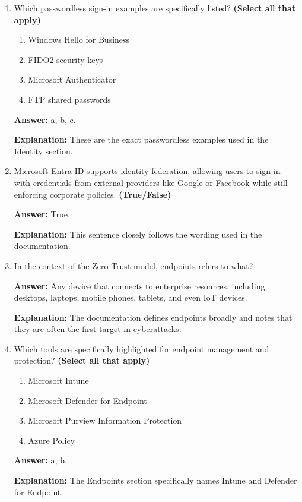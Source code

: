 \documentclass[10pt]{article}
\begin{document}
\begin{enumerate}[leftmargin=*]
\textbf{Explanation:} These three are named in the Identity section as core capabilities of Microsoft Entra ID.

\item Which passwordless sign-in examples are specifically listed? \textbf{(Select all that apply)}
\begin{enumerate}[label=\alph*., leftmargin=1.5em]
\item Windows Hello for Business
\item FIDO2 security keys
\item Microsoft Authenticator
\item FTP shared passwords
\end{enumerate}
\textbf{Answer:} a, b, c.

\textbf{Explanation:} These are the exact passwordless examples used in the Identity section.

\item Microsoft Entra ID supports identity federation, allowing users to sign in with credentials from external providers like Google or Facebook while still enforcing corporate policies. \textbf{(True/False)}

\textbf{Answer:} True.

\textbf{Explanation:} This sentence closely follows the wording used in the documentation.

\item In the context of the Zero Trust model, endpoints refers to what?

\textbf{Answer:} Any device that connects to enterprise resources, including desktops, laptops, mobile phones, tablets, and even IoT devices.

\textbf{Explanation:} The documentation defines endpoints broadly and notes that they are often the first target in cyberattacks.

\item Which tools are specifically highlighted for endpoint management and protection? \textbf{(Select all that apply)}
\begin{enumerate}[label=\alph*., leftmargin=1.5em]
\item Microsoft Intune
\item Microsoft Defender for Endpoint
\item Microsoft Purview Information Protection
\item Azure Policy
\end{enumerate}
\textbf{Answer:} a, b.

\textbf{Explanation:} The Endpoints section specifically names Intune and Defender for Endpoint.


\end{enumerate}
\end{document}
